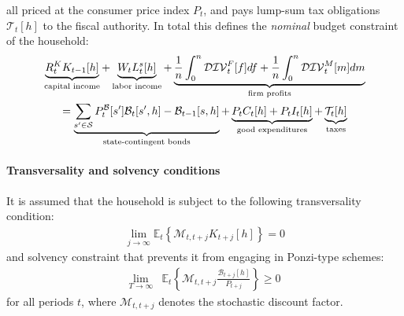   all priced at the consumer price index \(P_{t}\),
  and pays lump-sum tax obligations \(\mathcal{T}_{t}[h]\) to the fiscal authority.
In total this defines the \emph{nominal} budget constraint of the household:
\begin{multline}
  \underbrace{R^{K}_{t} K_{t-1}[h]}_{\text{capital income}}
+ \underbrace{W_{t} L^{s}_{t}[h]}_{\text{labor income}}
+ \underbrace{%
    \frac{1}{n} \int_{0}^{n} \mathcal{DIV}^{F}_{t}[f] df
  + \frac{1}{n} \int_{0}^{n} \mathcal{DIV}^{M}_{t}[m] dm
}_{\text{firm profits}}
\\
=
\underbrace{%
\sum_{s' \in \mathcal{S}} P^{\mathcal{B}}_{t}[s'] \mathcal{B}_{t}[s',h]
- \mathcal{B}_{t-1}[s,h]
}_{\text{state-contingent bonds}}
+ \underbrace{P_{t} C_{t}[h] + P_{t} I_{t}[h]}_{\text{good expenditures}}
+
\underbrace{\mathcal{T}_{t}[h]}_{\text{taxes}}
\label{eq:NewKeynesian.BudgetNominal}
\end{multline}

\paragraph{Transversality and solvency conditions}
It is assumed that the household is subject to the following transversality condition:
\begin{align*}
\lim_{j \rightarrow \infty} \mathbb{E}_{t} \left \{\mathcal{M}_{t,t+j} K_{t+j}[h] \right \} = 0
\end{align*}
and solvency constraint that prevents it from engaging in Ponzi-type schemes:
\begin{align*}
\lim_{T \rightarrow \infty} &\mathbb{E}_{t} \left \{\mathcal{M}_{t,t+j} \frac{\mathcal{B}_{t+j}[h]}{P_{t+j}} \right \} \geq 0
\end{align*}
for all periods \(t\), where \(\mathcal{M}_{t,t+j}\) denotes the stochastic discount factor.

